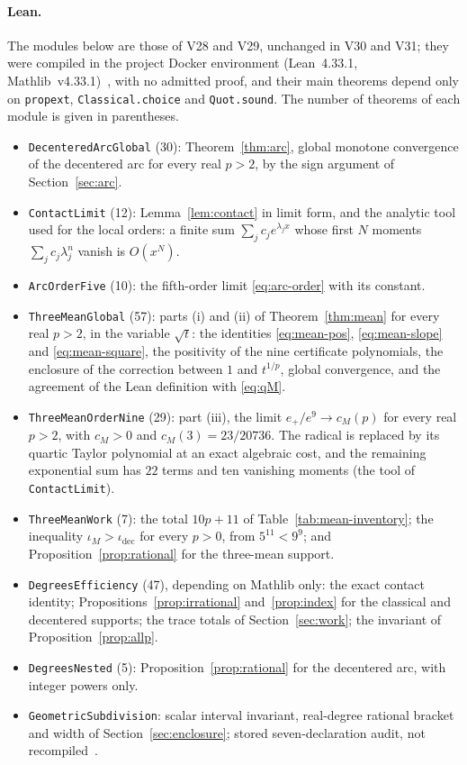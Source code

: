 \paragraph{Lean.}
The modules below are those of V28 and V29, unchanged in V30 and V31; they were compiled in the project
Docker environment (Lean~4.33.1, Mathlib~v4.33.1)~\cite{lean4,mathlib}, with no admitted proof, and their
main theorems depend only on \texttt{propext}, \texttt{Classical.choice} and \texttt{Quot.sound}. The
number of theorems of each module is given in parentheses.
\begin{itemize}
\item \texttt{DecenteredArcGlobal} (30): Theorem~\ref{thm:arc}, global monotone convergence of the
  decentered arc for every real $p>2$, by the sign argument of Section~\ref{sec:arc}.
\item \texttt{ContactLimit} (12): Lemma~\ref{lem:contact} in limit form, and the analytic tool used for
  the local orders: a finite sum $\sum_jc_je^{\lambda_jx}$ whose first $N$ moments
  $\sum_jc_j\lambda_j^{n}$ vanish is $O(x^{N})$.
\item \texttt{ArcOrderFive} (10): the fifth-order limit \eqref{eq:arc-order} with its constant.
\item \texttt{ThreeMeanGlobal} (57): parts (i) and (ii) of Theorem~\ref{thm:mean} for every real $p>2$,
  in the variable $\sqrt t$: the identities \eqref{eq:mean-pos}, \eqref{eq:mean-slope} and
  \eqref{eq:mean-square}, the positivity of the nine certificate polynomials, the enclosure of the
  correction between $1$ and $t^{1/p}$, global convergence, and the agreement of the Lean definition
  with \eqref{eq:qM}.
\item \texttt{ThreeMeanOrderNine} (29): part (iii), the limit $e_+/e^{9}\to c_M(p)$ for every real
  $p>2$, with $c_M>0$ and $c_M(3)=23/20736$. The radical is replaced by its quartic Taylor polynomial at
  an exact algebraic cost, and the remaining exponential sum has $22$ terms and ten vanishing moments
  (the tool of \texttt{ContactLimit}).
\item \texttt{ThreeMeanWork} (7): the total $10p+11$ of Table~\ref{tab:mean-inventory}; the inequality
  $\iota_M>\iota_{\mathrm{dec}}$ for every $p>0$, from $5^{11}<9^{9}$; and
  Proposition~\ref{prop:rational} for the three-mean support.
\item \texttt{DegreesEfficiency} (47), depending on Mathlib only: the exact contact identity;
  Propositions~\ref{prop:irrational} and~\ref{prop:index} for the classical and decentered supports;
  the trace totals of Section~\ref{sec:work}; the invariant of Proposition~\ref{prop:allp}.
\item \texttt{DegreesNested} (5): Proposition~\ref{prop:rational} for the decentered arc, with integer
  powers only.
\item \texttt{GeometricSubdivision}: scalar interval invariant, real-degree rational bracket and width
  of Section~\ref{sec:enclosure}; stored seven-declaration audit, not recompiled~\cite{supplS}.
\end{itemize}
